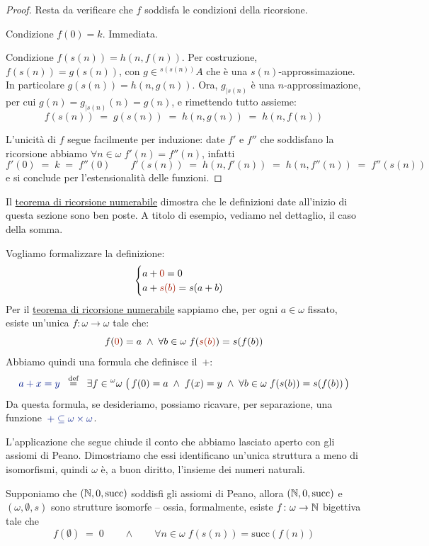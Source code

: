 \begin{proof}
Resta da verificare che $f$ soddisfa le condizioni della ricorsione.

{\drkblu Condizione $f(0) = k$.} Immediata.

{\drkblu Condizione $f(s(n)) = h(n,f(n))$.} Per costruzione, $f(s(n)) =
g(s(n))$, con $g \in {}^{s(s(n))}A$ che \`e una $s(n)$-approssimazione. In
particolare $g(s(n)) = h(n,g(n))$.
		Ora, $g_{|s(n)}$ \`e una $n$-approssimazione, per cui
$g(n) = g_{|s(n)}(n) = g(n)$, e rimettendo tutto assieme:
		\[ f(s(n)) \;=\; g(s(n)) \;=\; h(n,g(n)) \;=\; h(n,f(n))
			\]

	L'unicit\`a di $f$ segue facilmente per induzione: date $f'$ e $f''$ che soddisfano la ricorsione abbiamo
$\forall {n\in\omega}\; f'(n)=f''(n)$, infatti
	\[ f'(0) \;=\; k \;=\; f''(0) \qquad f'(s(n)) \;=\; h(n,f'(n))
\;=\; h(n,f''(n)) \;=\; f''(s(n))
		\]
	e si conclude
	per l'estensionalit\`a delle funzioni.
\end{proof}

Il \hyperref[ric1]{teorema di ricorsione numerabile} dimostra che le
definizioni date all'inizio di questa sezione sono ben poste.
A titolo di esempio, vediamo nel dettaglio, il caso della somma.

\begin{example}
	Vogliamo formalizzare la definizione:
	\[ \begin{cases}
		a + {\drkred 0} = 0\\
		a + {\drkred s(b)} = s(a+b)
	\end{cases}
		\]
	Per il \hyperref[ric1]{teorema di ricorsione numerabile} sappiamo
che, per ogni $a \in \omega$ fissato, esiste un'unica $f \colon \omega \to \omega$ tale che:
	\[ f({\drkred 0}) = a \;\land\; \forall {b \in \omega} \; f({\drkred s(b)}) = s(f(b))
		\]
	Abbiamo quindi una formula che definisce il~$+$:
	\[ {\drkblu a + x = y} \;\;\Mydef\;\; \exists {f \in {}^{\omega}\omega} \;
\big(\,f(0) = a \; \land  \; f(x) = y \; \land \; \forall {b \in \omega} \;
f(s(b)) = s(f(b))\,\big)
		\]
	Da questa formula, se desideriamo, possiamo ricavare, per
separazione, una
funzione~$\drkblu +\subseteq\omega\times\omega$.
\end{example}

L'applicazione che segue chiude il conto che abbiamo lasciato aperto con
gli assiomi di Peano. Dimostriamo che essi identificano un'unica struttura
a meno di isomorfismi, quindi $\omega$ \`e, a buon diritto, l'insieme dei numeri naturali.

\begin{theorem}\label{uninne}
	Supponiamo che $(\mathbb N, 0, \text{succ})$ soddisfi gli assiomi di
Peano, allora {\drkblu $(\mathbb N, 0, \text{succ})$ e $(\omega,\emptyset,s)$ sono
strutture isomorfe} -- ossia, formalmente, esiste
	$ f \colon \omega \to \mathbb N$ bigettiva tale che
\[f(\emptyset)\; =\; 0 \qquad\land\qquad\forall {n \in \omega} \; f(s(n))
= \text{succ}(f(n))\]
\end{theorem}

